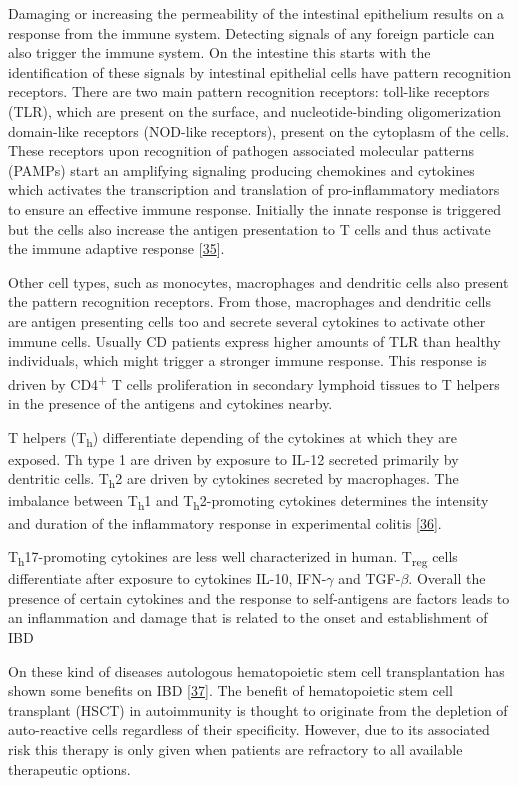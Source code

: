 \documentclass[
  12pt,
  a4paper,
  twoside,
  openright]{book}
\begin{document}
Damaging or increasing the permeability of the intestinal epithelium results on a response from the immune system.
Detecting signals of any foreign particle can also trigger the immune system.
On the intestine this starts with the identification of these signals by intestinal epithelial cells have pattern recognition receptors.
There are two main pattern recognition receptors: toll-like receptors (TLR), which are present on the surface, and nucleotide-binding oligomerization domain-like receptors (NOD-like receptors), present on the cytoplasm of the cells.
These receptors upon recognition of pathogen associated molecular patterns (PAMPs) start an amplifying signaling producing chemokines and cytokines which activates the transcription and translation of pro-inflammatory mediators to ensure an effective immune response.
Initially the innate response is triggered but the cells also increase the antigen presentation to T cells and thus activate the immune adaptive response {[}\protect\hyperlink{ref-mayorgas2021a}{35}{]}.

Other cell types, such as monocytes, macrophages and dendritic cells also present the pattern recognition receptors.
From those, macrophages and dendritic cells are antigen presenting cells too and secrete several cytokines to activate other immune cells.
Usually CD patients express higher amounts of TLR than healthy individuals, which might trigger a stronger immune response.
This response is driven by CD4\textsuperscript{+} T cells proliferation in secondary lymphoid tissues to T helpers in the presence of the antigens and cytokines nearby.

T helpers (T\textsubscript{h}) differentiate depending of the cytokines at which they are exposed.
Th type 1 are driven by exposure to IL-12 secreted primarily by dentritic cells.
T\textsubscript{h}2 are driven by cytokines secreted by macrophages.
The imbalance between T\textsubscript{h}1 and T\textsubscript{h}2-promoting cytokines determines the intensity and duration of the inflammatory response in experimental colitis {[}\protect\hyperlink{ref-neurath1996}{36}{]}.

T\textsubscript{h}17-promoting cytokines are less well characterized in human.
T\textsubscript{reg} cells differentiate after exposure to cytokines IL-10, IFN-\(\gamma\) and TGF-\(\beta\).
Overall the presence of certain cytokines and the response to self-antigens are factors leads to an inflammation and damage that is related to the onset and establishment of IBD

On these kind of diseases autologous hematopoietic stem cell transplantation has shown some benefits on IBD {[}\protect\hyperlink{ref-corraliza}{37}{]}.
The benefit of hematopoietic stem cell transplant (HSCT) in autoimmunity is thought to originate from the depletion of auto-reactive cells regardless of their specificity.
However, due to its associated risk this therapy is only given when patients are refractory to all available therapeutic options.
\end{document}
